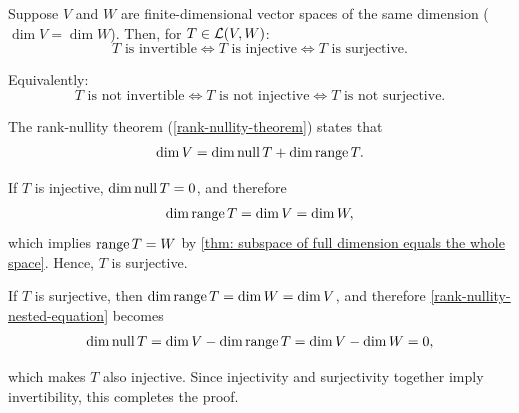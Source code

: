   \setcounter{thm}{64}
  \begin{thm} 
    \label{thm: injectivity is equivalent to surjectivity}
    Suppose $V$ and $W$ are finite-dimensional vector spaces of the same dimension ($\dim V = \dim W$). Then, for $T\in \mathcal{L}(V,W)$:
    \begin{equation}
      T \text{ is invertible} \iff T \text{ is injective} \iff T \text{ is surjective.}
    \end{equation}

    Equivalently:
    \begin{equation}
      T \text{ is not invertible} \iff T \text{ is not injective} \iff T \text{ is not surjective.}
    \end{equation}
  \end{thm}
  \begin{prf}
    The rank-nullity theorem (\ref{rank-nullity-theorem}) states that
    \begin{equation}
      \label{rank-nullity-nested-equation}
      \dim V = \dim \operatorname{null} T + \dim \operatorname{range} T.
    \end{equation}

    If $T$ is injective, $\dim \operatorname{null} T = 0$, and therefore
    \begin{equation}
      \dim \operatorname{range} T = \dim V = \dim W,
    \end{equation}
    which implies $\operatorname{range} T = W$ by \ref{thm: subspace of full dimension equals the whole space}. Hence, $T$ is surjective.

    If $T$ is surjective, then $\dim \operatorname{range} T = \dim W = \dim V$, and therefore \eqref{rank-nullity-nested-equation} becomes
    \begin{equation}
      \dim \operatorname{null} T = \dim V - \dim \operatorname{range} T = \dim V - \dim W = 0,
    \end{equation}

    which makes $T$ also injective.
    Since injectivity and surjectivity together imply invertibility, this completes the proof.
  \end{prf}


